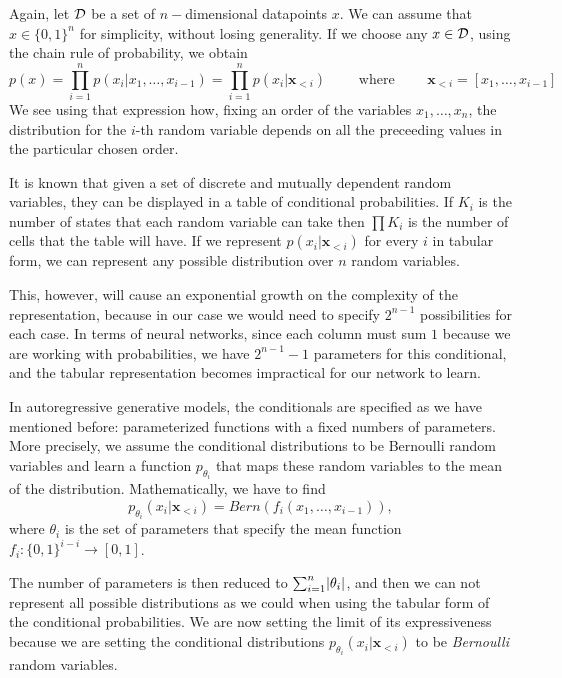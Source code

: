 Again, let $\mathcal{D}$ be a set of $n-$dimensional datapoints $x$. We can assume that $x \in \{0,1\}^n$ for simplicity, without losing generality. If we choose any $x\in \mathcal{D}$, using the chain rule of probability, we obtain
$$
p(x) = \prod_{i=1} ^n p(x_i | x_1,\dots,x_{i-1}) = \prod_{i = 1}^n p(x_i|\bm{x}_{<i}) \quad \quad \text{ where } \quad \quad \bm{x}_{<i} = [x_1,\dots, x_{i-1}]
$$
We see using that expression how, fixing an order of the variables $x_1,\dots,x_n$, the distribution for the $i$-th random variable depends on all the preceeding values in the particular chosen order. 

It is known that given a set of discrete and mutually dependent random variables, they can be displayed in a table of conditional probabilities. If $K_i$ is the number of states that each random variable can take
then $\prod K_i$ is the number of cells that the table will have. If we represent $p(x_i|\bm{x}_{<i})$ for every $i$ in tabular form, we can represent
any possible distribution over $n$ random variables. 

This, however, will cause an exponential growth on the complexity of the representation, because in our case we would need to specify $2^{n-1}$ possibilities 
for each case. In terms of neural networks, since each column must sum $1$ because we are working with probabilities, we have $2^{n-1}-1$ parameters for this conditional, and the tabular representation
becomes impractical for our network to learn.

In autoregressive generative models, the conditionals are specified as we have mentioned before: parameterized functions with a fixed numbers of parameters. More precisely,  we assume 
the conditional distributions to be Bernoulli random variables and learn a function $p_{\theta_i}$ that maps these random variables to the mean of the distribution. Mathematically, we have to find 
$$
p_{\theta_i}(x_i | \bm{x}_{<i}) = Bern(f_i(x_1,\dots,x_{i-1})),
$$
where $\theta_i$ is the set of parameters that specify the mean function $f_i:\{0,1\}^{i-i} \to [0,1]$.

The number of parameters is then reduced to $\sum_{i=1}^n \lvert\theta_i\rvert$, and then we can not represent all possible distributions as we could when using the tabular form of the conditional probabilities.
We are now setting the limit of its expressiveness because we are setting the conditional distributions $p_{\theta_i}(x_i|\bm{x}_{<i})$ to be \emph{Bernoulli} random variables. 

